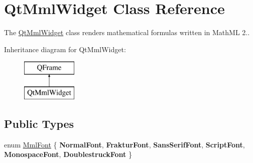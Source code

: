 \hypertarget{class_qt_mml_widget}{}\section{Qt\+Mml\+Widget Class Reference}
\label{class_qt_mml_widget}


The \mbox{\hyperlink{class_qt_mml_widget}{Qt\+Mml\+Widget}} class renders mathematical formulas written in Math\+ML 2..  


Inheritance diagram for Qt\+Mml\+Widget\+:\begin{figure}[H]
\begin{center}
\leavevmode
\includegraphics[height=2.000000cm]{class_qt_mml_widget}
\end{center}
\end{figure}
\subsection*{Public Types}
\begin{DoxyCompactItemize}
\item 
enum \mbox{\hyperlink{class_qt_mml_widget_ac3fde39f7b605557d80bded69f985d2a}{Mml\+Font}} \{ \newline
{\bfseries Normal\+Font}, 
{\bfseries Fraktur\+Font}, 
{\bfseries Sans\+Serif\+Font}, 
{\bfseries Script\+Font}, 
\newline
{\bfseries Monospace\+Font}, 
{\bfseries Doublestruck\+Font}
 \}
\end{DoxyCompactItemize}
